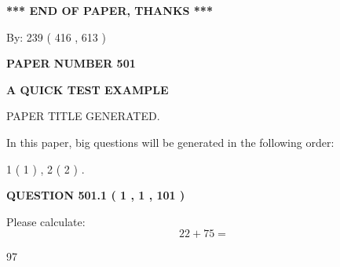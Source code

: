 \documentclass[12pt]{article}
\begin{document}
   
   
   
\vspace{1.0in} 
{\textbf{\large{ *** END OF PAPER, THANKS *** }}} 
   
   
\hspace{1.0in} By: 
 239 ( 416 ,  613 )
   
   
   
   
\newpage 
\setcounter{page}{ 
   501001 } 
   
   
   
   
 {\textbf{ \Large{ PAPER NUMBER  501  }}}
   
   
\vspace{0.2in}
   
   
   
   
   
   
   
   
 \vspace{0.2in}
{\LARGE {\textbf{ A QUICK TEST EXAMPLE}}}
   
   
 PAPER TITLE GENERATED.
   
   
   
\vspace{0.2in}
   
In this paper, big questions will be generated in the following order: 
   
   
   1 ( 1 )
 ,
   2 ( 2 )
 .
  
\vspace{0.2in}
  
{\textbf{\Large{QUESTION
501.1 
 ( 1 , 1 , 101 )
}}}
  
  
 
Please calculate:
\begin{equation}
22 +  %
75 = \nonumber
\end{equation}
 
 
 
\noindent{}
 
 

97
 
 
\noindent{}
 
 

 
 
 
\noindent{}
 
\end{document}
